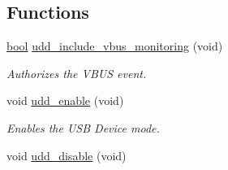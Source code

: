 \subsection*{Functions}
\begin{DoxyCompactItemize}
\item 
\hyperlink{group__group__xmega__utils_ga97a80ca1602ebf2303258971a2c938e2}{bool} \hyperlink{group__udd__group_gaa4cac8c35ae056e26cf4ab5b426bbe09}{udd\-\_\-include\-\_\-vbus\-\_\-monitoring} (void)
\begin{DoxyCompactList}\small\item\em Authorizes the V\-B\-U\-S event. \end{DoxyCompactList}\item 
\hypertarget{group__udd__group_ga9792d1899ae058e3984d6a622fe2ad42}{void \hyperlink{group__udd__group_ga9792d1899ae058e3984d6a622fe2ad42}{udd\-\_\-enable} (void)}\label{group__udd__group_ga9792d1899ae058e3984d6a622fe2ad42}

\begin{DoxyCompactList}\small\item\em Enables the U\-S\-B Device mode. \end{DoxyCompactList}\item 
\hypertarget{group__udd__group_gab283432057b934e9d73ac9282d9b0f11}{void \hyperlink{group__udd__group_gab283432057b934e9d73ac9282d9b0f11}{udd\-\_\-disable} (void)}\label{group__udd__group_gab283432057b934e9d73ac9282d9b0f11}


\end{DoxyCompactItemize}
